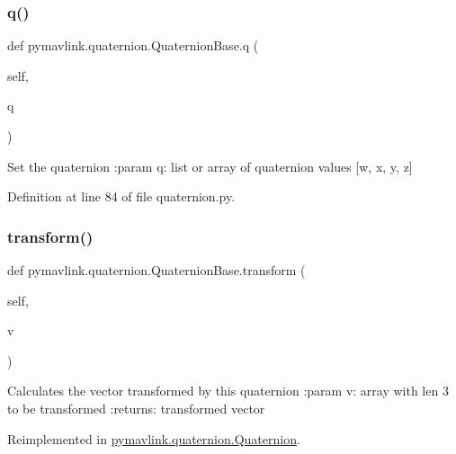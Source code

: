 \mbox{\label{classpymavlink_1_1quaternion_1_1QuaternionBase_adf7daed709c0f21d0225039830450543}} 
\subsubsection{\texorpdfstring{q()}{q()}\hspace{0.1cm}{\footnotesize\ttfamily [2/2]}}
{\footnotesize\ttfamily def pymavlink.\+quaternion.\+Quaternion\+Base.\+q (\begin{DoxyParamCaption}\item[{}]{self,  }\item[{}]{q }\end{DoxyParamCaption})}

\begin{DoxyVerb}Set the quaternion
:param q: list or array of quaternion values [w, x, y, z]
\end{DoxyVerb}
 

Definition at line 84 of file quaternion.\+py.

\mbox{\label{classpymavlink_1_1quaternion_1_1QuaternionBase_a747068d71180696e5131e2ca31c2a13c}} 
\subsubsection{\texorpdfstring{transform()}{transform()}}
{\footnotesize\ttfamily def pymavlink.\+quaternion.\+Quaternion\+Base.\+transform (\begin{DoxyParamCaption}\item[{}]{self,  }\item[{}]{v }\end{DoxyParamCaption})}

\begin{DoxyVerb}Calculates the vector transformed by this quaternion
:param v: array with len 3 to be transformed
:returns: transformed vector
\end{DoxyVerb}
 

Reimplemented in \mbox{\hyperlink{classpymavlink_1_1quaternion_1_1Quaternion_a79b86f00f3500a6c34fa3a099f3714f7}{pymavlink.\+quaternion.\+Quaternion}}.



